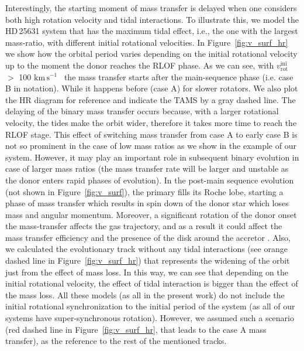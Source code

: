 \documentclass{aa}
\newcommand{\kms}{$\mathrm{km\,s^{-1}}$}
\DeclareRobustCommand{\Figref}[1]{Figure~\ref{#1}}
\begin{document}
Interestingly, the starting moment of mass transfer is delayed when one considers both high rotation velocity and tidal interactions.
To illustrate this, we model the HD\,25631
system that has the maximum tidal effect, i.e., the one with the largest
mass-ratio, with different initial rotational velocities. In
\Figref{fig:v_surf_hr} we show how the orbital period varies depending
on the initial rotational velocity up to the moment the donor reaches
the RLOF phase. As we can see, with $v_\mathrm{rot}^\mathrm{ini}$ $>$ 100
\kms~ the mass transfer starts after the main-sequence phase (i.e.
case B in \citealt{kippenhahn:67} notation). While it happens before (case A) for slower rotators. We
also plot the HR diagram for reference and indicate the TAMS by a gray
dashed line. The delaying of the binary mass transfer occurs because, with a
larger rotational velocity, the tides make the orbit wider, therefore it takes more time to reach the RLOF stage.
This effect of switching mass transfer from case A to early case B is not so prominent in the case of low mass ratios as we show in the example of our system.
However, it may play an important role in subsequent binary evolution
in case of larger mass ratios (the mass transfer rate will be larger and unstable as the donor enters rapid phases of evolution).
In the post-main sequence evolution (not shown in \Figref{fig:v_surf}), the primary fills its
Roche lobe, starting a phase of mass transfer which results in spin down of the donor star which loses mass and angular momentum.
Moreover, a significant rotation of the donor onset the mass-transfer affects the gas trajectory, and as a result it could affect the mass transfer efficiency and the presence of the disk around the accretor \citep[see,][]{Hendriks_2023}.
Also, we calculated the evolutionary track without any tidal interactions (see orange dashed line in \Figref{fig:v_surf_hr}) that represents the widening of the orbit just from the effect of mass loss.
In this way, we can see that depending on the initial rotational velocity, the effect of tidal interaction is bigger than the effect of the mass loss.
All these models (as all in the present work) do not include the initial rotational synchronization to the initial period of the system (as all of our systems have super-synchronous rotation).
However, we assumed such a scenario (red dashed line in \Figref{fig:v_surf_hr}, that leads to the case A mass transfer), as the reference to the rest of the mentioned tracks.
\end{document}
